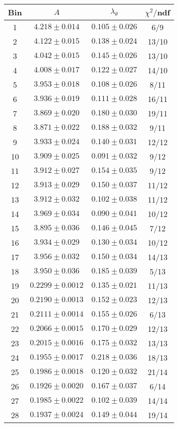 \begin{tabular}{c|c|c|c}
Bin & $A$ & $\lambda_\theta$ & $\chi^2/$ndf \\
\hline
1 & $4.218\pm0.014$ & $0.105\pm0.026$ & 6/9 \\
2 & $4.122\pm0.015$ & $0.138\pm0.024$ & 13/10 \\
3 & $4.042\pm0.015$ & $0.145\pm0.026$ & 13/10 \\
4 & $4.008\pm0.017$ & $0.122\pm0.027$ & 14/10 \\
5 & $3.953\pm0.018$ & $0.108\pm0.026$ & 8/11 \\
6 & $3.936\pm0.019$ & $0.111\pm0.028$ & 16/11 \\
7 & $3.869\pm0.020$ & $0.180\pm0.030$ & 19/11 \\
8 & $3.871\pm0.022$ & $0.188\pm0.032$ & 9/11 \\
9 & $3.933\pm0.024$ & $0.140\pm0.031$ & 12/12 \\
10 & $3.909\pm0.025$ & $0.091\pm0.032$ & 9/12 \\
11 & $3.912\pm0.027$ & $0.154\pm0.035$ & 9/12 \\
12 & $3.913\pm0.029$ & $0.150\pm0.037$ & 11/12 \\
13 & $3.912\pm0.032$ & $0.102\pm0.038$ & 11/12 \\
14 & $3.969\pm0.034$ & $0.090\pm0.041$ & 10/12 \\
15 & $3.895\pm0.036$ & $0.146\pm0.045$ & 7/12 \\
16 & $3.934\pm0.029$ & $0.130\pm0.034$ & 10/12 \\
17 & $3.956\pm0.032$ & $0.150\pm0.034$ & 14/13 \\
18 & $3.950\pm0.036$ & $0.185\pm0.039$ & 5/13 \\
19 & $0.2299\pm0.0012$ & $0.135\pm0.021$ & 11/13 \\
20 & $0.2190\pm0.0013$ & $0.152\pm0.023$ & 12/13 \\
21 & $0.2111\pm0.0014$ & $0.155\pm0.026$ & 6/13 \\
22 & $0.2066\pm0.0015$ & $0.170\pm0.029$ & 12/13 \\
23 & $0.2015\pm0.0016$ & $0.175\pm0.032$ & 13/13 \\
24 & $0.1955\pm0.0017$ & $0.218\pm0.036$ & 18/13 \\
25 & $0.1986\pm0.0018$ & $0.120\pm0.032$ & 21/14 \\
26 & $0.1926\pm0.0020$ & $0.167\pm0.037$ & 6/14 \\
27 & $0.1985\pm0.0022$ & $0.102\pm0.039$ & 14/14 \\
28 & $0.1937\pm0.0024$ & $0.149\pm0.044$ & 19/14 \\

\end{tabular}
